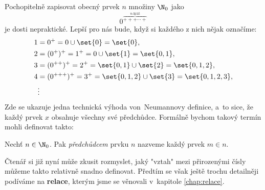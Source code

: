 Pochopitelně zapisovat obecný prvek $n$ množiny $\N_0$ jako
\begin{equation*}
    0^{\overbrace{+++\cdots+}^{n\text{-krát}}}
\end{equation*}
je dosti nepraktické. Lepší pro nás bude, když si každého z nich nějak označíme:
\begin{align*}
    1&=0^+=0\cup\set{0}=\set{0},\\
    2&=(0^+)^+=1^+=0\cup\set{1}=\set{0,1},\\
    3&=(0^{++})^+=2^+=\set{0,1}\cup\set{2}=\set{0,1,2},\\
    4&=(0^{+++})^+=3^+=\set{0,1,2}\cup\set{3}=\set{0,1,2,3},\\
    &\vdots
\end{align*}
Zde se ukazuje jedna technická výhoda von~Neumannovy definice, a~to sice, že každý prvek $x$ obsahuje všechny své předchůdce. Formálně bychom takový termín mohli definovat takto:
\begin{definition}[Předchůdce]\label{def:predchudce}
    Nechť $n\in\N_0$. Pak \emph{předchůdcem} prvku $n$ nazveme každý prvek $m\in n$.
\end{definition}
Čtenář si již nyní může zkusit rozmyslet, jaký "vztah" mezi přirozenými čísly můžeme takto relativně snadno definovat. Předtím se však ještě trochu detailněji podíváme na \textbf{relace}, kterým jsme se věnovali v~kapitole \ref{chap:relace}.